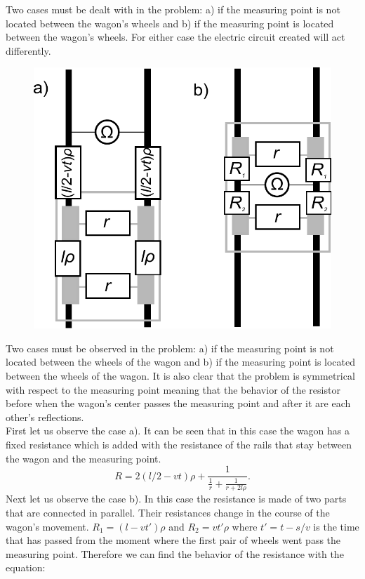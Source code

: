 \hinteng
Two cases must be dealt with in the problem: a) if the measuring point is not located between the wagon's wheels and b) if the measuring point is located between the wagon's wheels. For either case the electric circuit created will act differently.

\solueng
\begin{figure}
\includegraphics[width=\linewidth]{2012-v2g-08-rong_lahendus}
\end{figure}
Two cases must be observed in the problem: a) if the measuring point is not located between the wheels of the wagon and b) if the measuring point is located between the wheels of the wagon. It is also clear that the problem is symmetrical with respect to the measuring point meaning that the behavior of the resistor before when the wagon’s center passes the measuring point and after it are each other’s reflections.\\
First let us observe the case a). It can be seen that in this case the wagon has a fixed resistance which is added with the resistance of the rails that stay between the wagon and the measuring point. 
\[
R=2(l/2-vt)\rho+\frac{1}{\frac{1}{r}+\frac{1}{r+2l\rho}}.
\] 
Next let us observe the case b). In this case the resistance is made of two parts that are connected in parallel. Their resistances change in the course of the wagon’s movement. $R_1=(l-vt')\rho$ and $R_2=vt'\rho$ where $t'=t-s/v$ is the time that has passed from the moment where the first pair of wheels went pass the measuring point. Therefore we can find the behavior of the resistance with the equation:
